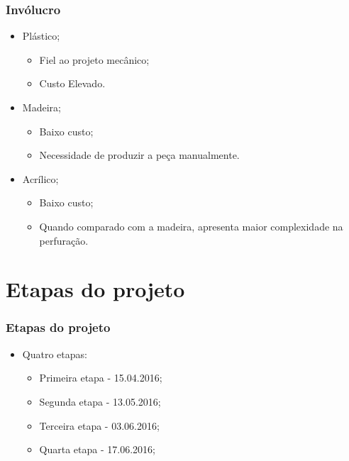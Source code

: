 \documentclass[hyperref={pdfpagelabels=false}]{beamer}
\begin{document}
            \begin{frame}\frametitle{Invólucro}

          	          \begin{itemize}
           	            \item Plástico;
            		          \begin{itemize}
            			         \item Fiel ao projeto mecânico;
                                 \item Custo Elevado.
            		          \end{itemize}
            	         \item Madeira;
                              \begin{itemize}
            			         \item Baixo custo;
                                 \item Necessidade de produzir a peça manualmente.
            		          \end{itemize}
        	             \item Acrílico;
                              \begin{itemize}
            			         \item Baixo custo;
                                 \item Quando comparado com a madeira, apresenta maior complexidade na perfuração.
            		          \end{itemize}
             	      \end{itemize}

           	     \end{frame}

    \section{Etapas do projeto}

        \begin{frame}\frametitle{Etapas do projeto}

      	     \begin{itemize}
       	        \item Quatro etapas:
                    \newline
    		      \begin{itemize}
    			     \item Primeira etapa - 15.04.2016;
                        \newline
    			     \item Segunda etapa - 13.05.2016;
                        \newline
    			     \item Terceira etapa - 03.06.2016;
                        \newline
    			     \item Quarta etapa - 17.06.2016;
    		      \end{itemize}
         	 \end{itemize}

       	\end{frame}
\end{document}
